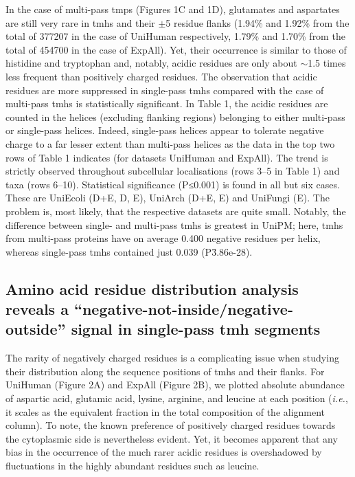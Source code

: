 In the case of multi-pass \gls{tmp}s (Figures 1C and 1D), glutamates and aspartates are still very rare in \gls{tmh}s and their $\pm$5 residue flanks (1.94\% and 1.92\% from the total of 377207 in the case of UniHuman respectively, 1.79\% and 1.70\% from the total of 454700 in the case of ExpAll). Yet, their occurrence is similar to those of histidine and tryptophan and, notably, acidic residues are only about $\sim$1.5 times less frequent than positively charged residues. The observation that acidic residues are more suppressed in single-pass \gls{tmh}s compared with the case of multi-pass \gls{tmh}s is statistically significant. In Table 1, the acidic residues are counted in the helices (excluding flanking regions) belonging to either multi-pass or single-pass helices. Indeed, single-pass helices appear to tolerate negative charge to a far lesser extent than multi-pass helices as the data in the top two rows of Table 1 indicates (for datasets UniHuman and ExpAll). The trend is strictly observed throughout subcellular localisations (rows 3--5 in Table 1) and taxa (rows 6--10). Statistical significance (P≤0.001) is found in all but six cases. These are UniEcoli (D+E, D, E), UniArch (D+E, E) and UniFungi (E). The problem is, most likely, that the respective datasets are quite small. Notably, the difference between single- and multi-pass \gls{tmh}s is greatest in UniPM\@; here, \gls{tmh}s from multi-pass proteins have on average 0.400 negative residues per helix, whereas single-pass \gls{tmh}s contained just 0.039 (P\=3.86e-28).

\subsection{Amino acid residue distribution analysis reveals a ``negative-not-inside/negative-outside'' signal in single-pass \gls{tmh} segments}

The rarity of negatively charged residues is a complicating issue when studying their distribution along the sequence positions of \gls{tmh}s and their flanks. For UniHuman (Figure 2A) and ExpAll (Figure 2B), we plotted absolute abundance of aspartic acid, glutamic acid, lysine, arginine, and leucine at each position (\textit{i.e.}, it scales as the equivalent fraction in the total composition of the alignment column). To note, the known preference of positively charged residues towards the cytoplasmic side is nevertheless evident. Yet, it becomes apparent that any bias in the occurrence of the much rarer acidic residues is overshadowed by fluctuations in the highly abundant residues such as leucine.

